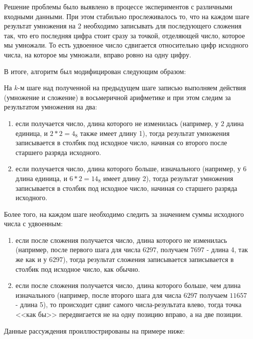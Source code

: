 \documentclass[14pt, russian]{scrartcl}
\begin{document}
Решение проблемы было выявлено в процессе экспериментов с различными входными данными. При этом стабильно прослеживалось то, что на каждом шаге результат умножения на 2 необходимо записывать для последующего сложения так, что его последняя цифра стоит сразу за точкой, отделяющей число, которое мы умножали. То есть удвоенное число сдвигается относительно цифр исходного числа, на которое мы умножали, вправо ровно на одну цифру.

В итоге, алгоритм был модифицирован следующим образом: 

На $k$-м шаге над полученной на предыдущем шаге записью выполняем действия (умножение и сложение) в восьмеричной арифметике и при этом следим за результатом умножения на два:
\begin{enumerate}
    \item если получается число, длина которого не изменилась (например, у $2$ длина единица, и $2*2 =4_8$ также имеет длину 1), тогда результат умножения записывается в столбик под исходное число, начиная со второго после старшего разряда исходного.
    \item если получается число, длина которого больше, изначального (например, у $6$ длина единица, и $6*2 =14_8$ имеет длину 2), тогда результат умножения записывается в столбик под исходное число, начиная со старшего разряда исходного.
\end{enumerate}

Более того, на каждом шаге необходимо следить за значением суммы исходного числа с удвоенным:
\begin{enumerate}
    \item если после сложения получается число, длина которого не изменилась (например, после первого шага для числа $6297$, получаем $7697$ - длина 4, так же как и у $6297$), тогда результат сложения записывается записывается в столбик под исходное число, как обычно.
    \item если после сложения получается число, длина которого больше, чем длина изначального (например, после второго шага для числа $6297$ получаем $11657$ - длина 5), то происходит сдвиг самого числа-результата влево, тогда точка <<как бы>> передвигается не на одну позицию вправо, а на две позиции.
\end{enumerate}

Данные рассуждения проиллюстрированы на примере ниже:
\end{document}
